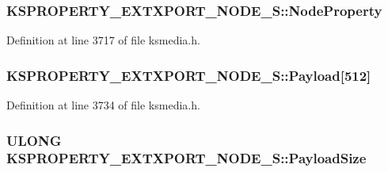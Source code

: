 \subsubsection[{\texorpdfstring{Node\+Property}{NodeProperty}}]{ K\+S\+P\+R\+O\+P\+E\+R\+T\+Y\+\_\+\+E\+X\+T\+X\+P\+O\+R\+T\+\_\+\+N\+O\+D\+E\+\_\+\+S\+::\+Node\+Property}\hypertarget{struct_k_s_p_r_o_p_e_r_t_y___e_x_t_x_p_o_r_t___n_o_d_e___s_a45a13e2b9610d6b3339947be7f106a80}{}\label{struct_k_s_p_r_o_p_e_r_t_y___e_x_t_x_p_o_r_t___n_o_d_e___s_a45a13e2b9610d6b3339947be7f106a80}


Definition at line 3717 of file ksmedia.\+h.

\subsubsection[{\texorpdfstring{Payload}{Payload}}]{ K\+S\+P\+R\+O\+P\+E\+R\+T\+Y\+\_\+\+E\+X\+T\+X\+P\+O\+R\+T\+\_\+\+N\+O\+D\+E\+\_\+\+S\+::\+Payload\mbox{[}512\mbox{]}}\hypertarget{struct_k_s_p_r_o_p_e_r_t_y___e_x_t_x_p_o_r_t___n_o_d_e___s_a70ebbb8dc9d82f23af0994b186d2681d}{}\label{struct_k_s_p_r_o_p_e_r_t_y___e_x_t_x_p_o_r_t___n_o_d_e___s_a70ebbb8dc9d82f23af0994b186d2681d}


Definition at line 3734 of file ksmedia.\+h.

\subsubsection[{\texorpdfstring{Payload\+Size}{PayloadSize}}]{\setlength{\rightskip}{0pt plus 5cm}U\+L\+O\+NG K\+S\+P\+R\+O\+P\+E\+R\+T\+Y\+\_\+\+E\+X\+T\+X\+P\+O\+R\+T\+\_\+\+N\+O\+D\+E\+\_\+\+S\+::\+Payload\+Size}\hypertarget{struct_k_s_p_r_o_p_e_r_t_y___e_x_t_x_p_o_r_t___n_o_d_e___s_a8367d654b642f96190cf6d0dd09916ee}{}\label{struct_k_s_p_r_o_p_e_r_t_y___e_x_t_x_p_o_r_t___n_o_d_e___s_a8367d654b642f96190cf6d0dd09916ee}


